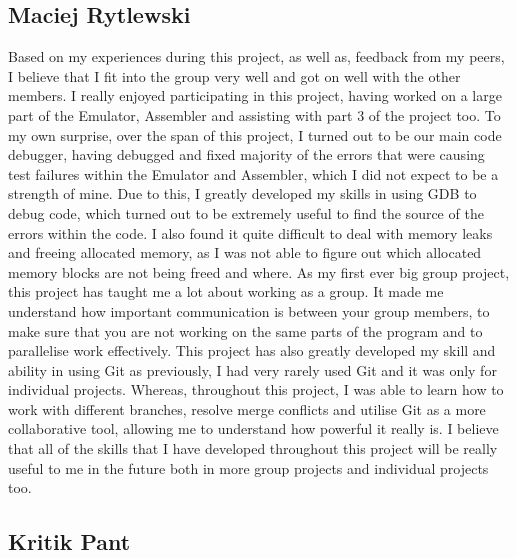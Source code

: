 \documentclass[11pt]{article}
\begin{document}
\subsection{Maciej Rytlewski}

Based on my experiences during this project, as well as, feedback from my peers, I believe that I fit into the group very well and got on well with the other members. I really enjoyed participating 
in this project, having worked on a large part of the Emulator, Assembler and assisting with part 3 of the project too. To my own surprise, over the span of this project, I turned out to be 
our main code debugger, having debugged and fixed majority of the errors that were causing test failures within the Emulator and Assembler, which I did not expect to be a strength of mine. 
Due to this, I greatly developed my skills in using GDB to debug code, which turned out to be extremely useful to find the source of the errors within the code. I also found it quite difficult to deal with memory 
leaks and freeing allocated memory, as I was not able to figure out which allocated memory blocks are not being freed and where.
\newline
As my first ever big group project, this project has taught me a lot about working as a group. It made me understand how important communication is between your group members, to make sure 
that you are not working on the same parts of the program and to parallelise work effectively. This project has also greatly developed my skill and ability in using Git as previously, I had 
very rarely used Git and it was only for individual projects. Whereas, throughout this project, I was able to learn how to work with different branches, resolve merge conflicts and utilise 
Git as a more collaborative tool, allowing me to understand how powerful it really is. I believe that all of the skills that I have developed throughout this project 
will be really useful to me in the future both in more group projects and individual projects too.

\subsection{Kritik Pant}
\end{document}

